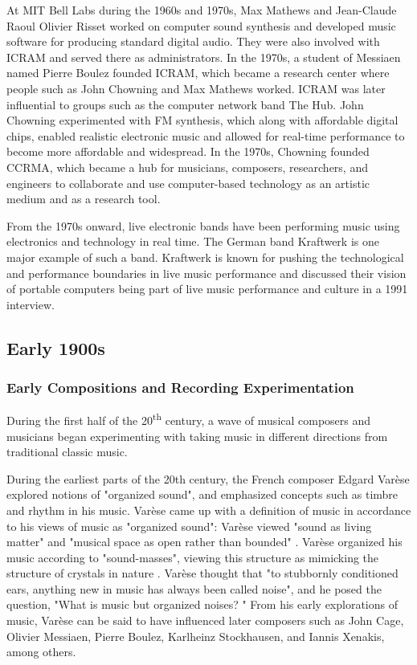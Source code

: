 \documentclass[letterpaper, 12pt]{article}
\begin{document}
%
At MIT Bell Labs during the 1960s and 1970s, Max Mathews and Jean-Claude Raoul Olivier Risset worked on computer sound synthesis and developed music software for producing standard digital audio.
%
They were also involved with ICRAM and served there as administrators.
%
In the 1970s, a student of Messiaen named Pierre Boulez founded ICRAM, which became a research center where people such as John Chowning and Max Mathews worked.
%
ICRAM was later influential to groups such as the computer network band The Hub.
%
John Chowning experimented with FM synthesis, which along with affordable digital chips, enabled realistic electronic music and allowed for real-time performance to become more affordable and widespread.
%
In the 1970s, Chowning founded CCRMA, which became a hub for musicians, composers, researchers, and engineers to collaborate and use computer-based technology as an artistic medium and as a research
tool.

%
From the 1970s onward, live electronic bands have been performing music using electronics and technology in real time.
%
The German band Kraftwerk is one major example of such a band.
%
Kraftwerk is known for pushing the technological and performance boundaries in live music performance and discussed their vision of portable computers being part of live music performance and culture in a 1991 interview.

\vspace*{24pt}

\subsection{Early 1900s}

\subsubsection{Early Compositions and Recording Experimentation} %

During the first half of the 20\textsuperscript{th} century, a wave of musical composers and musicians began experimenting with taking music in different directions from traditional classic music.


%
During the earliest parts of the 20th century, the French composer Edgard Varèse explored notions of "organized sound", and emphasized concepts such as timbre and rhythm in his music. 
%
Varèse came up with a definition of music in accordance to his views of music as "organized sound": Varèse viewed "sound as living matter" and "musical space as open rather than bounded" \citep{wen1966open}.
%
Varèse organized his music according to "sound-masses", viewing this structure as mimicking the structure of crystals in nature \citep{wen1966varese}.
%
Varèse thought that "to stubbornly conditioned ears, anything new in music has always been called noise", and he posed the question, "What is music but organized noises? \citep{varese1966liberation}"
%
From his early explorations of music, Varèse can be said to have influenced later composers such as John Cage, Olivier Messiaen, Pierre Boulez, Karlheinz Stockhausen, and Iannis Xenakis, among others.
\end{document}
